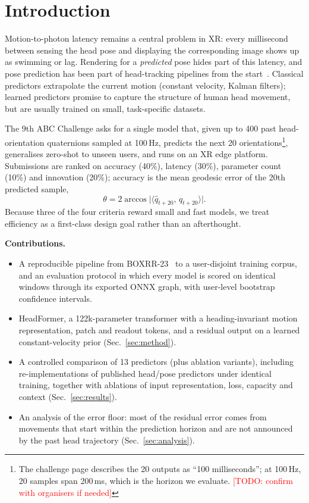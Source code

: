 \documentclass[conference]{IEEEtran}
\newcommand{\todo}[1]{\textcolor{red}{[TODO: #1]}}
\newcommand{\ours}{HeadFormer}   %
\begin{document}
\section{Introduction}
Motion-to-photon latency remains a central problem in XR: every millisecond between sensing the head pose and displaying the
corresponding image shows up as swimming or lag. Rendering for a \emph{predicted} pose hides part of this latency, and pose
prediction has been part of head-tracking pipelines from the start~\cite{azuma1995,lavalle2014}. Classical predictors
extrapolate the current motion (constant velocity, Kalman filters); learned predictors promise to capture the structure of
human head movement, but are usually trained on small, task-specific datasets.

The 9th ABC Challenge asks for a single model that, given up to 400 past head-orientation quaternions sampled at 100\,Hz,
predicts the next 20 orientations\footnote{The challenge page describes the 20 outputs as ``100 milliseconds''; at 100\,Hz,
20 samples span 200\,ms, which is the horizon we evaluate. \todo{confirm with organisers if needed}}, generalises zero-shot
to unseen users, and runs on an XR edge platform. Submissions are ranked on accuracy (40\%), latency (30\%), parameter
count (10\%) and innovation (20\%); accuracy is the mean geodesic error of the 20th predicted sample,
\begin{equation}
\theta = 2\arccos\bigl|\langle \hat{q}_{t+20},\, q_{t+20}\rangle\bigr| .
\label{eq:metric}
\end{equation}
Because three of the four criteria reward small and fast models, we treat efficiency as a first-class design goal rather
than an afterthought.

\textbf{Contributions.}
\begin{itemize}
\item A reproducible pipeline from BOXRR-23~\cite{nair2024boxrr} to a user-disjoint training corpus, and an evaluation
protocol in which every model is scored on identical windows through its exported ONNX graph, with user-level bootstrap
confidence intervals.
\item \ours, a 122k-parameter transformer with a heading-invariant motion representation, patch and readout tokens, and a
residual output on a learned constant-velocity prior (Sec.~\ref{sec:method}).
\item A controlled comparison of 13 predictors (plus ablation variants), including re-implementations of published head/pose predictors under
identical training, together with ablations of input representation, loss, capacity and context (Sec.~\ref{sec:results}).
\item An analysis of the error floor: most of the residual error comes from movements that start within the prediction
horizon and are not announced by the past head trajectory (Sec.~\ref{sec:analysis}).
\end{itemize}
\end{document}
